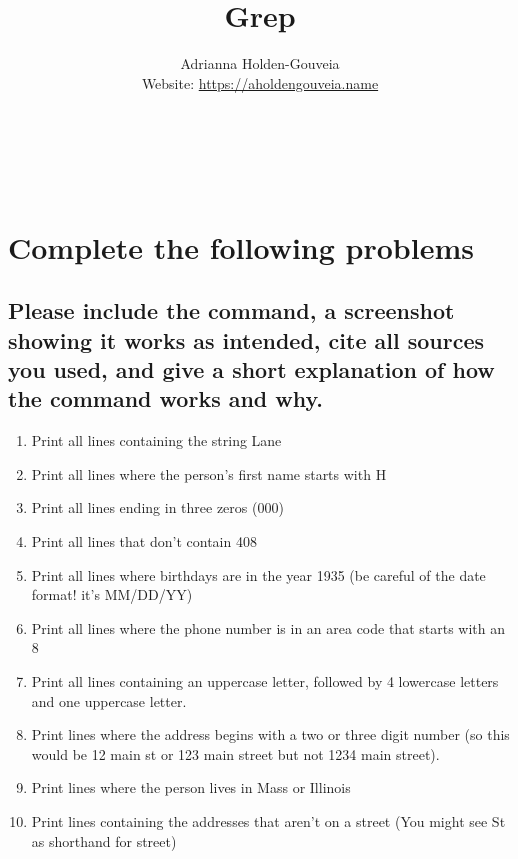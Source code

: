 \documentclass[12pt]{article}
\title{Grep}
\author{
        Adrianna Holden-Gouveia \\
        Website: \url{https://aholdengouveia.name}\\
        \date{\vspace{-5ex}} 
        \faLinkedin{: aholdengouveia} \\
        \faGithub {: aholdengouveia} \\
        \faTwitter {: aholdengouveia} \\
        }
\begin{document}
    

\maketitle


\section*{Complete the following problems}

\subsection*{Please include the command, a screenshot showing it works as intended, cite all sources you used, and give a short explanation of how the command works and why.}
    \begin{enumerate}
        \item Print all lines containing the string Lane
        \item Print all lines where the person's first name starts with H
        \item Print all lines ending in three zeros (000)
        \item Print all lines that don't contain 408
        \item Print all lines where birthdays are in the year 1935 (be careful of the date format! it's MM/DD/YY)
        \item Print all lines where the phone number is in an area code that starts with an 8
        \item Print all lines containing an uppercase letter, followed by 4 lowercase letters and one uppercase letter.
        \item Print lines where the address begins with a two or three digit number (so this would be 12 main st or 123 main street but not 1234 main street).
        \item Print lines where the person lives in Mass or Illinois
        \item Print lines containing the addresses that aren't on a street (You might see St as shorthand for street)


    \end{enumerate}
\end{document}
